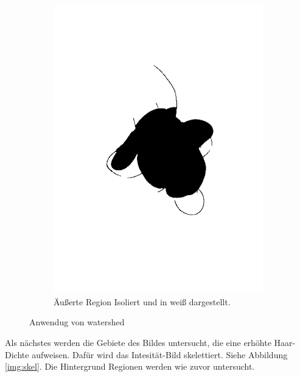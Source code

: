 \documentclass[german,a4paper,12pt,smallheadings,headsepline, titlepage, liststotoc, idextotoc,bibtoctoc,blibliography = totocnumbered]{scrartcl}
\begin{document}
\begin{figure}
\begin{subfigure}[b]{0.475\textwidth}
		\includegraphics[width=\textwidth]{fig64/08outer section.png}
		\caption[]{Äußerte Region Isoliert und in weiß dargestellt.}
		\label{img:outerSection}
	\end{subfigure}
	\caption[  ]
	{\small Anwendug von watershed} 
	\label{img:tstM}
\end{figure}

Als nächstes werden die Gebiete des Bildes untersucht, die eine erhöhte Haar-Dichte aufweisen.
Dafür wird das Intesität-Bild skelettiert. Siehe Abbildung \ref{img:skel}.
Die Hintergrund Regionen werden wie zuvor untersucht.
\end{document}
